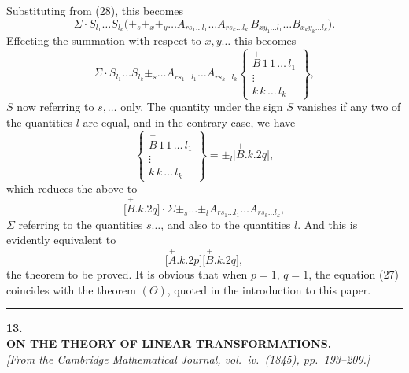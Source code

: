 \documentclass[11pt]{article}
\begin{document}
Substituting from (28), this becomes
\[
\Sigma \cdot S_{l_1}\ldots S_{l_k}\bigl(\pm_s \pm_x \pm_y \ldots A_{rs_1\ldots l_1}\ldots A_{rs_k\ldots l_k}\,B_{xy_1\ldots l_1}\ldots B_{x_ky_k\ldots l_k}\bigr) \tag{30}.
\]
Effecting the summation with respect to $x, y \ldots$ this becomes
\[
\Sigma \cdot S_{l_1}\ldots S_{l_k} \pm_s \ldots A_{rs_1\ldots l_1}\ldots A_{rs_k\ldots l_k}\left\{
\begin{array}{c}
\overset{+}{B}\,1\,1\,\ldots\,l_1 \\[2pt]
\vdots \\
k\,k\,\ldots\,l_k
\end{array}
\right\} \tag{31},
\]
$S$ now referring to $s, \ldots$ only. The quantity under the sign $S$ vanishes if any two
of the quantities $l$ are equal, and in the contrary case, we have
\[
\left\{
\begin{array}{c}
\overset{+}{B}\,1\,1\,\ldots\,l_1 \\[2pt]
\vdots \\
k\,k\,\ldots\,l_k
\end{array}
\right\}=\pm_l\bigl[\overset{+}{B}.k.2q\bigr] \tag{32},
\]
which reduces the above to
\[
\bigl[\overset{+}{B}.k.2q\bigr]\cdot \Sigma \pm_s \ldots \pm_l A_{rs_1\ldots l_1}\ldots A_{rs_k\ldots l_k} \tag{33},
\]
$\Sigma$ referring to the quantities $s\ldots$, and also to the quantities $l$. And this is evidently
equivalent to
\[
\bigl[\overset{+}{A}.k.2p\bigr]\bigl[\overset{+}{B}.k.2q\bigr] \tag{34},
\]
the theorem to be proved. It is obvious that when $p=1$, $q=1$, the equation (27)
coincides with the theorem $(\Theta)$, quoted in the introduction to this paper.

\bigskip
\hrule
\bigskip


\begin{center}
{\Large\bfseries 13.}\\[0.6em]
{\large\bfseries ON THE THEORY OF LINEAR TRANSFORMATIONS.}\\[0.4em]
\textit{[From the Cambridge Mathematical Journal, vol.~iv.~(1845), pp.~193--209.]}
\end{center}

\medskip
\end{document}
